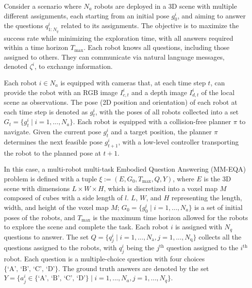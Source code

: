 
Consider a scenario where $N_a$ robots are deployed in a 3D scene with multiple different assignments, each starting from an initial pose $g^i_0$, and aiming to answer the questions $q^i_{1:N_q}$ related to its assignments.
The objective is to maximize the success rate while minimizing the exploration time, with all answers required within a time horizon $T_\text{max}$.
Each robot knows all questions, including those assigned to others.
They can communicate via natural language messages, denoted $\zeta^i$, to exchange information.

Each robot $i\in N_a$ is equipped with cameras that, at each time step $t$, can provide the robot with an RGB image $I^i_{c,t}$ and a depth image $I^i_{d,t}$ of the local scene as observations. The pose (2D position and orientation) of each robot at each time step is denoted as $g^i_t$, with the poses of all robots collected into a set $G_t = \{g^i_t \mid i=1,...,N_a\}$. Each robot is equipped with a collision-free planner $\pi$ to navigate. Given the current pose $g^i_{t}$ and a target position, the planner $\pi$ determines the next feasible pose $g^i_{t+1}$, with a low-level controller transporting the robot to the planned pose at $t+1$. 

In this case, a multi-robot multi-task Embodied Question Answering (MM-EQA) problem is defined with a tuple $\xi:= (E, G_0, T_\text{max}, Q, Y)$, where $E$ is the 3D scene with dimensions $L \times W \times H$, which is discretized into a voxel map $M$ composed of cubes with a side length of $l$. $L$, $W$, and $H$ representing the length, width, and height of the voxel map $M$; $G_0 = \{g^i_0 \mid i=1,...,N_a\}$ is a set of initial poses of the robots, and $T_\text{max}$ is the maximum time horizon allowed for the robots to explore the scene and complete the task. Each robot $i$ is assigned with $N_q$ questions to answer. The set $Q = \{q^i_j \mid i=1,...,N_\text{a},j=1,...,N_\text{q}\}$ collects all the questions assigned to the robots, with $q^i_j$ being the $j^\mathrm{th}$ question assigned to the $i^\mathrm{th}$ robot. Each question is a multiple-choice question with four choices $\{\text{`A', `B', `C', `D'}\}$. The ground truth answers are denoted by the set $Y = \{a^i_j\in \{\text{`A', `B', `C', `D'}\} \mid i=1,...,N_a,j=1,...,N_q\}$. 
